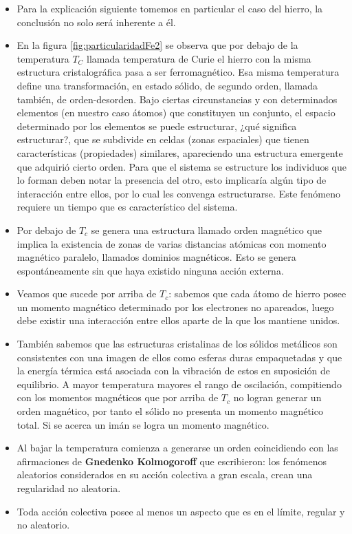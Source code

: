\begin{itemize}
	\item Para la explicación siguiente tomemos en particular el caso del hierro, la conclusión no solo será inherente a él.
	
	\item En la figura \ref{fig:particularidadFe2} se observa que por debajo de la temperatura $T_{C}$ llamada temperatura de Curie el hierro con la misma estructura cristalográfica pasa a ser ferromagnético. Esa misma temperatura
define una transformación, en estado sólido, de segundo orden, llamada también, de orden-desorden. Bajo ciertas circunstancias y con determinados elementos (en nuestro caso átomos) que constituyen un conjunto, el espacio determinado por los elementos se puede estructurar, ¿qué significa estructurar?, que se subdivide en celdas (zonas espaciales) que tienen características (propiedades) similares, apareciendo una estructura emergente que adquirió cierto orden. Para que el sistema se estructure los individuos que lo forman deben notar la presencia del otro, esto implicaría algún tipo de interacción entre ellos, por lo cual les convenga estructurarse. Este fenómeno requiere un tiempo que es característico del sistema.

	\item Por debajo de $T_{c}$ se genera una estructura llamado orden magnético que implica la existencia de zonas de varias distancias atómicas con momento magnético paralelo, llamados dominios magnéticos. Esto se genera espontáneamente sin que haya existido ninguna acción externa.
	
	\item Veamos que sucede por arriba de $T_{c}$: sabemos que cada átomo de hierro posee un momento magnético determinado por los electrones no apareados, luego debe existir una interacción entre ellos aparte de la que los mantiene unidos.
	
	\item También sabemos que las estructuras cristalinas de los sólidos metálicos son consistentes con una imagen de ellos como esferas duras empaquetadas y que la energía térmica está asociada con la vibración de estos en suposición de equilibrio. A mayor temperatura mayores el rango de oscilación, compitiendo con los momentos magnéticos que por arriba de $T_{c}$ no logran generar un orden magnético, por tanto el sólido no presenta un momento magnético total. Si se acerca un imán se logra un momento magnético.

	\item Al bajar la temperatura comienza a generarse un orden coincidiendo con las afirmaciones de \textbf{Gnedenko Kolmogoroff} que escribieron: los fenómenos aleatorios considerados en su acción colectiva a gran escala, crean una regularidad no aleatoria.

	\item Toda acción colectiva posee al menos un aspecto que es en el límite, regular y no aleatorio.
\end{itemize}


